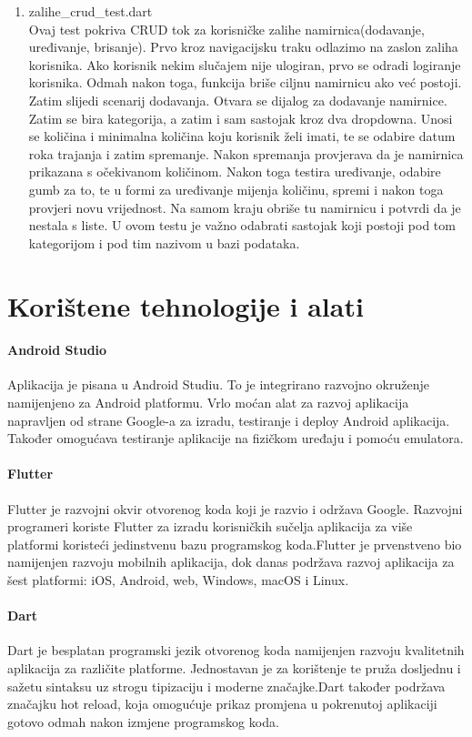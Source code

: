 \documentclass[diplomskirad]{fer}
\begin{document}
\begin{enumerate}
    \item zalihe\_crud\_test.dart
    \\
    Ovaj test pokriva CRUD tok za korisničke zalihe namirnica(dodavanje, uređivanje, brisanje). Prvo kroz navigacijsku traku odlazimo na zaslon zaliha korisnika. Ako korisnik nekim slučajem nije ulogiran, prvo se odradi logiranje korisnika. Odmah nakon toga, funkcija briše ciljnu namirnicu ako već postoji. Zatim slijedi scenarij dodavanja. Otvara se dijalog za dodavanje namirnice. Zatim se bira kategorija, a zatim i sam sastojak kroz dva dropdowna. Unosi se količina i minimalna količina koju korisnik želi imati, te se odabire datum roka trajanja i zatim spremanje. Nakon spremanja provjerava da je namirnica prikazana s očekivanom količinom. Nakon toga testira uređivanje, odabire gumb za to, te u formi za uređivanje mijenja količinu, spremi i nakon toga provjeri novu vrijednost. Na samom kraju obriše tu namirnicu i potvrdi da je nestala s liste. U ovom testu je važno odabrati sastojak koji postoji pod tom kategorijom i pod tim nazivom u bazi podataka.
\end{enumerate}



\chapter{Korištene tehnologije i alati}
\subsubsection{Android Studio} 
Aplikacija je pisana u Android Studiu. To je integrirano razvojno okruženje namijenjeno za Android platformu. Vrlo moćan alat za razvoj aplikacija napravljen od strane Google-a za izradu, testiranje i deploy Android aplikacija. Također omogućava testiranje aplikacije na fizičkom uređaju i pomoću emulatora. \cite{AndroidStudio}
\subsubsection{Flutter}
Flutter je razvojni okvir otvorenog koda koji je razvio i održava Google. Razvojni programeri koriste Flutter za izradu korisničkih sučelja aplikacija za više platformi koristeći jedinstvenu bazu programskog koda.Flutter je prvenstveno bio namijenjen razvoju mobilnih aplikacija, dok danas podržava razvoj aplikacija za šest platformi: iOS, Android, web, Windows, macOS i Linux. \cite{Flutter}
\subsubsection{Dart}
Dart je besplatan programski jezik otvorenog koda namijenjen razvoju kvalitetnih aplikacija za različite platforme. Jednostavan je za korištenje te pruža dosljednu i sažetu sintaksu uz strogu tipizaciju i moderne značajke.Dart također podržava značajku hot reload, koja omogućuje prikaz promjena u pokrenutoj aplikaciji gotovo odmah nakon izmjene programskog koda.
\cite{Dart}
\end{document}
